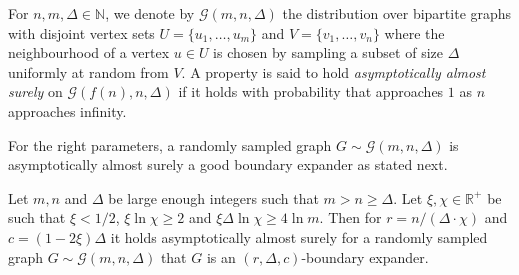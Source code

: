 \documentclass{theoretics}
\newcommand{\Rplus}     {\mathbb{R}^{+}}
\newcommand{\N}         {\mathbb{N}}
\newcommand{\set}[1]{\{ #1 \}}
\newcommand{\aas}{asymptotically almost surely\xspace}
\newcommand{\numpigeons}{m}
\newcommand{\numholes}{n}
\newcommand{\diff}{\xi}
\newcommand{\GdegMax}{\Delta}
\newcommand{\Gdist}{\mathcal{G}}
\numberwithin{equation}{section}
\begin{document}
For $\numholes, \numpigeons, \GdegMax \in \N$, we
denote by $\Gdist(\numpigeons, \numholes, \GdegMax)$ the distribution over
bipartite graphs
with disjoint vertex sets $U = \set{u_1, \ldots, u_{\numpigeons}}$ and 
$V = \set{v_1, \ldots, v_{\numholes}}$
where the neighbourhood of a vertex $u \in U$ is chosen by sampling 
a subset of size $\GdegMax$ uniformly at random from $V$.
A property is said to hold
\emph{\aas} on $\Gdist(f(\numholes), \numholes, \GdegMax)$ if it
holds with probability that approaches $1$ as $\numholes$ approaches infinity.

For the right parameters, a randomly sampled graph
$G \sim \Gdist(\numpigeons, \numholes, \GdegMax)$ is asymptotically
almost surely a good boundary expander as stated next.

\begin{lemma}\label{lem:expander}
  Let $\numpigeons,\numholes$ and $\GdegMax$ be large enough integers such that 
  $\numpigeons > \numholes \ge \GdegMax $.
  Let $\diff, \chi \in \Rplus$
  be such that 
  $\diff < 1/2$,
  $\diff \ln \chi \ge 2$
  and $\diff \GdegMax \ln \chi \ge 4 \ln \numpigeons$.
  Then for
  $r =  \numholes /(\GdegMax \cdot \chi )$ 
  and $c = (1 - 2 \diff) \GdegMax$
  it holds
  asymptotically almost surely for a randomly sampled graph
  $G \sim \Gdist(\numpigeons,\numholes,\GdegMax)$
  that
  $G$ is an 
  $(r, \GdegMax, c)$-boundary expander.
\end{lemma}
\end{document}
